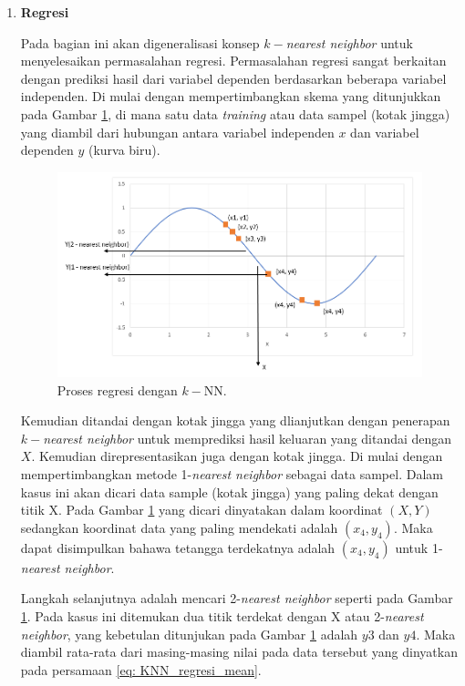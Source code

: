 \begin{enumerate}[label=\textbf{\alph*).}]
	\item \textbf{Regresi}
	
	Pada bagian ini akan digeneralisasi konsep $k-$\textit{nearest neighbor} untuk menyelesaikan permasalahan regresi. Permasalahan regresi sangat berkaitan dengan prediksi hasil dari variabel dependen berdasarkan beberapa variabel independen. Di mulai dengan mempertimbangkan skema yang ditunjukkan pada Gambar \ref{fig:k-nn_sinosoid}, di mana satu data \textit{training} atau data sampel (kotak jingga) yang diambil dari hubungan antara variabel independen $x$ dan variabel dependen $y$ (kurva biru). 
	
	\begin{figure} [!h] \centering
		\includegraphics[scale=0.6]{img/k-nn_sinosoid.png}
		\caption{Proses regresi dengan $k-$NN.}
		\label{fig:k-nn_sinosoid}
	\end{figure}
	
	Kemudian ditandai dengan kotak jingga yang dlianjutkan dengan penerapan $k-$\textit{nearest neighbor} untuk memprediksi hasil keluaran yang ditandai dengan $X$. Kemudian direpresentasikan juga dengan kotak jingga. Di mulai dengan mempertimbangkan metode 1-\textit{nearest neighbor} sebagai data sampel. Dalam kasus ini akan dicari data sample (kotak jingga) yang paling dekat dengan titik X. Pada Gambar \ref{fig:k-nn_sinosoid} yang dicari dinyatakan dalam koordinat $(X, Y)$ sedangkan koordinat data yang paling mendekati adalah $(x_{4}, y_{4})$. Maka dapat disimpulkan bahawa tetangga terdekatnya adalah $(x_{4}, y_{4})$ untuk 1-\textit{nearest neighbor}.
	\vspace{1ex}
	
	Langkah selanjutnya adalah mencari 2-\textit{nearest neighbor} seperti pada Gambar \ref{fig:k-nn_sinosoid}. Pada kasus ini ditemukan dua titik terdekat dengan X atau 2-\textit{nearest neighbor}, yang kebetulan ditunjukan pada Gambar \ref{fig:k-nn_sinosoid} adalah $y3$ dan $y4$. Maka diambil rata-rata dari masing-masing nilai pada data tersebut yang dinyatkan pada persamaan \ref{eq: KNN_regresi_mean}.
	

\end{enumerate}
